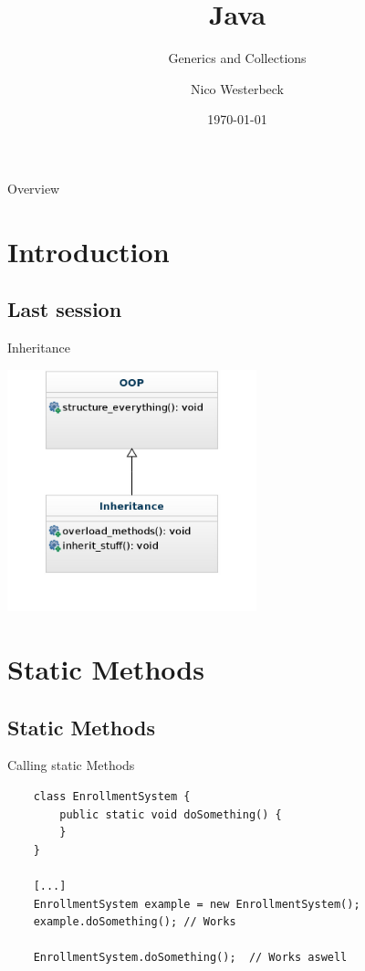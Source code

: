 

\title{Java}
\subtitle{Generics and Collections}
\author{Nico Westerbeck}
\date{\today}



\begin{frame}
\titlepage
\end{frame}
\begin{frame}{Overview}
\tableofcontents
\end{frame}

\section{Introduction}

\subsection{Last session}
\begin{frame}{Inheritance}
	\begin{center}
		\includegraphics[height=7cm]{res/inheritance-diagram.jpg}
	\end{center}
\end{frame}

\section{Static Methods}
\subsection{Static Methods}
\begin{frame}[fragile]{Calling static Methods}
\begin{lstlisting}
	class EnrollmentSystem {
		public static void doSomething() {
		}
	}
	
	[...]
	EnrollmentSystem example = new EnrollmentSystem();
	example.doSomething(); // Works
	
	EnrollmentSystem.doSomething();  // Works aswell
	
\end{lstlisting}
\end{frame}

